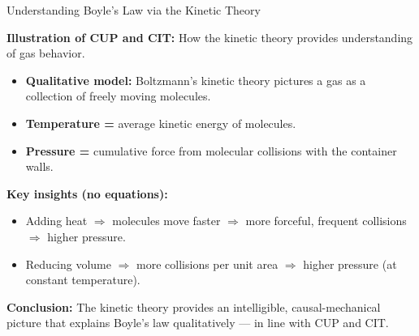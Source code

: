 \documentclass[fleqn]{beamer}
\begin{document}
\begin{frame}[allowframebreaks]{Understanding Boyle's Law via the Kinetic Theory}

\small
\textbf{Illustration of CUP and CIT:} How the kinetic theory provides
understanding of gas behavior.

\vspace{0.5em}
\begin{itemize}
  \item \textbf{Qualitative model:} Boltzmann's kinetic theory pictures
    a gas as a collection of freely moving molecules.
  \item \textbf{Temperature =} average kinetic energy of molecules.
  \item \textbf{Pressure =} cumulative force from molecular collisions
    with the container walls.
\end{itemize}

\vspace{1em}
\begin{center}
\end{center}

\framebreak

\small
\textbf{Key insights (no equations):}
\begin{itemize}
  \item Adding heat $\Rightarrow$ molecules move faster $\Rightarrow$
    more forceful, frequent collisions $\Rightarrow$ higher pressure.
  \item Reducing volume $\Rightarrow$ more collisions per unit area
    $\Rightarrow$ higher pressure (at constant temperature).
\end{itemize}

\vspace{0.5em}
\textbf{Conclusion:} The kinetic theory provides an intelligible,
causal-mechanical picture that explains Boyle's law qualitatively ---
in line with CUP and CIT.

\end{frame}
\end{document}
